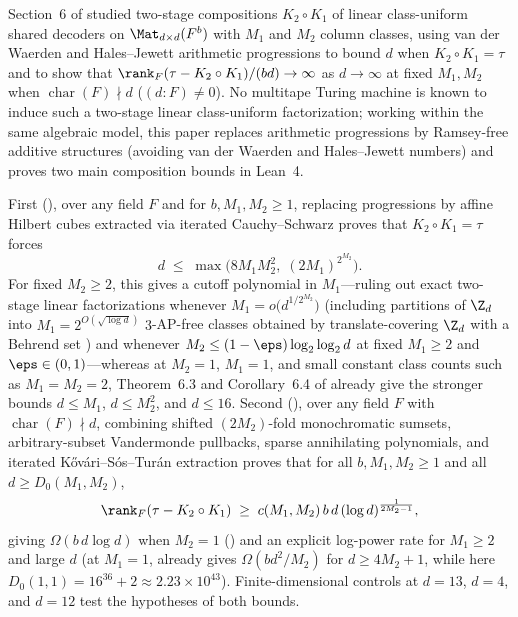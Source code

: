 Section~6 of \cite{SharedDecoders2026} studied two-stage compositions $K_2 \circ K_1$ of linear
class-uniform shared decoders on $\Mat_{d\times d}(F^b)$ with $M_1$ and $M_2$ column classes, using
van der Waerden and Hales--Jewett arithmetic progressions to bound $d$ when $K_2 \circ K_1 = \tau$
and to show that $\rank_F(\tau - K_2 \circ K_1)/(bd) \to \infty$ as $d \to \infty$ at fixed
$M_1, M_2$ when $\operatorname{char}(F) \nmid d$ ($(d : F) \ne 0$). No multitape Turing machine is
known to induce such a two-stage linear class-uniform
factorization; working within the same algebraic model, this paper replaces arithmetic progressions
by Ramsey-free additive structures (avoiding van der Waerden and Hales--Jewett numbers) and proves two
main composition bounds in Lean~4.

First (), over any field $F$ and for $b, M_1, M_2 \ge 1$, replacing progressions by
affine Hilbert cubes extracted via iterated Cauchy--Schwarz proves that $K_2 \circ K_1 = \tau$ forces
\[
  d \;\le\; \max\bigl(8 M_1 M_2^2,\; (2 M_1)^{2^{M_2}}\bigr).
\]
For fixed $M_2 \ge 2$, this gives a cutoff polynomial in $M_1$---ruling out exact two-stage linear
factorizations whenever $M_1 = o\bigl(d^{1/2^{M_2}}\bigr)$ (including partitions of $\Z_d$ into
$M_1 = 2^{O(\sqrt{\log d})}$ $3$-AP-free classes obtained by translate-covering $\Z_d$ with a Behrend
set \cite{Behrend1946}) and whenever $M_2 \le (1-\eps)\log_2\log_2 d$ at fixed $M_1 \ge 2$ and
$\eps \in (0, 1)$---whereas at $M_2 = 1$, $M_1 = 1$, and small constant class counts such as
$M_1 = M_2 = 2$, Theorem~6.3 and Corollary~6.4 of \cite{SharedDecoders2026} already give the stronger
bounds $d \le M_1$, $d \le M_2^2$, and $d \le 16$. Second (), over any field
$F$ with $\operatorname{char}(F) \nmid d$, combining shifted $(2M_2)$-fold monochromatic sumsets,
arbitrary-subset
Vandermonde pullbacks, sparse annihilating polynomials, and iterated K\H{o}v\'ari--S\'os--Tur\'an
extraction proves that for all $b, M_1, M_2 \ge 1$ and all $d \ge D_0(M_1, M_2)$,
\[
  \rank_F(\tau - K_2 \circ K_1)
  \;\ge\;
  c(M_1, M_2)\,b\,d\,(\log d)^{\frac{1}{2M_2 - 1}},
\]
giving $\Omega(b\,d\log d)$ when $M_2 = 1$ () and an explicit log-power rate for
$M_1 \ge 2$ and large $d$ (at $M_1 = 1$, \cite[Theorem~6.6]{SharedDecoders2026} already gives
$\Omega(bd^2/M_2)$ for $d \ge 4M_2 + 1$, while here $D_0(1,1) = 16^{36} + 2 \approx 2.23 \times 10^{43}$).
Finite-dimensional controls at $d = 13$, $d = 4$, and $d = 12$ test the hypotheses of both bounds.

